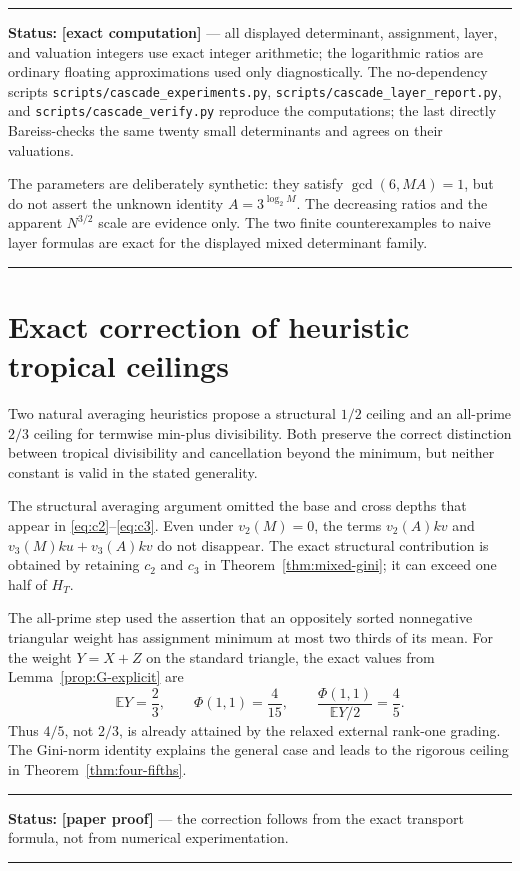 \documentclass[11pt,oneside]{article}
\theoremstyle{definition}
\theoremstyle{remark}
\newcommand{\statusnew}{\textcolor{newgreen}{\textbf{[paper proof]}}}
\newcommand{\statusexactcomp}{\textcolor{computeviolet}{\textbf{[exact computation]}}}
\newenvironment{statusbox}[1]
{\begin{center}\begin{minipage}{0.94\textwidth}\raggedright\hbadness=10000\hrule
\vspace{0.45em}\textbf{Status:} #1\par\vspace{0.35em}}
{\vspace{0.35em}\hrule\end{minipage}\end{center}}
\begin{document}
\begin{statusbox}{\statusexactcomp{} --- all displayed determinant, assignment, layer, and valuation
integers use exact integer arithmetic; the logarithmic ratios are ordinary floating
approximations used only diagnostically.  The no-dependency scripts
\texttt{scripts/cascade\_experiments.py},
\texttt{scripts/cascade\_layer\_report.py}, and
\texttt{scripts/cascade\_verify.py} reproduce the computations; the last directly
Bareiss-checks the same twenty small determinants and agrees on their valuations.}
The parameters are deliberately synthetic: they satisfy $\gcd(6,MA)=1$, but do not assert the
unknown identity $A=3^{\log_2M}$.  The decreasing ratios and the apparent $N^{3/2}$ scale are
evidence only.  The two finite counterexamples to naive layer formulas are exact for the
displayed mixed determinant family.
\end{statusbox}

\section{Exact correction of heuristic tropical ceilings}
\label{sec:minplus-correction}

Two natural averaging heuristics propose a structural $1/2$ ceiling and an all-prime $2/3$
ceiling for termwise min-plus divisibility.  Both preserve the correct distinction between
tropical divisibility and cancellation beyond the minimum, but neither constant is valid in
the stated generality.

The structural averaging argument omitted the base and cross depths that appear in
\eqref{eq:c2}--\eqref{eq:c3}.  Even under $v_2(M)=0$, the terms
$v_2(A)kv$ and $v_3(M)ku+v_3(A)kv$ do not disappear.  The exact structural contribution is
obtained by retaining $c_2$ and $c_3$ in Theorem~\ref{thm:mixed-gini}; it can exceed one half
of $H_T$.

The all-prime step used the assertion that an oppositely sorted nonnegative triangular weight
has assignment minimum at most two thirds of its mean.  For the weight $Y=X+Z$ on the standard
triangle, the exact values from Lemma~\ref{prop:G-explicit} are
\[
 \mathbb E Y=\frac23,
 \qquad
 \Phi(1,1)=\frac4{15},
 \qquad
 \frac{\Phi(1,1)}{\mathbb EY/2}=\frac45.
\]
Thus $4/5$, not $2/3$, is already attained by the relaxed external rank-one grading.  The
Gini-norm identity explains the general case and leads to the rigorous ceiling in
Theorem~\ref{thm:four-fifths}.

\begin{statusbox}{\statusnew{} --- the correction follows from the exact transport formula,
not from numerical experimentation.}
\end{statusbox}
\end{document}
